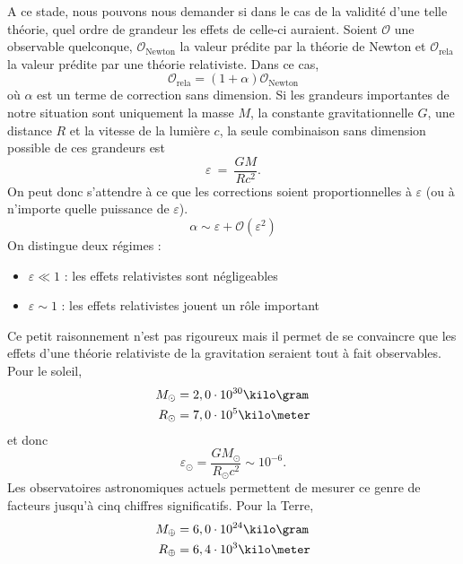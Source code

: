 \documentclass[a4paper,11pt]{report}
\theoremstyle{definition}
\theoremstyle{plain}
\theoremstyle{definition}
\theoremstyle{remark}
\renewcommand{\O}{\mathcal{O}}
\begin{document}
        A ce stade, nous pouvons nous demander si dans le cas de la validité d'une telle théorie, quel ordre de grandeur les effets de celle-ci auraient. Soient $\O$ une observable quelconque, $\O_{\text{Newton}}$ la valeur prédite par la théorie de Newton et $\O_{\text{rela}}$ la valeur prédite par une théorie relativiste. Dans ce cas,
        \begin{equation}
            \O_{\text{rela}} = (1+\alpha)\O_{\text{Newton}}
        \end{equation}
        où $\alpha$ est un terme de correction sans dimension. Si les grandeurs importantes de notre situation sont uniquement la masse $M$, la constante gravitationnelle $G$, une distance $R$ et la vitesse de la lumière $c$, la seule combinaison sans dimension possible de ces grandeurs est 
        \begin{equation}
            \varepsilon~\hat{=}~\frac{GM}{Rc^2}.
        \end{equation}
        On peut donc s'attendre à ce que les corrections soient proportionnelles à $\varepsilon$ (ou à n'importe quelle puissance de $\varepsilon$).
        \begin{equation}
            \alpha\sim\varepsilon+\O(\varepsilon^2)
        \end{equation}
        On distingue deux régimes :
        \begin{itemize}[label=\textbullet]
            \item $\varepsilon\ll 1$ : les effets relativistes sont négligeables
            \item $\varepsilon\sim 1$ : les effets relativistes jouent un rôle important
        \end{itemize}
        Ce petit raisonnement n'est pas rigoureux mais il permet de se convaincre que les effets d'une théorie relativiste de la gravitation seraient tout à fait observables. Pour le soleil,
        \begin{align*}
            M_\odot &= 2,0\cdot10^{30}\kilo\gram \\
            R_\odot &= 7,0\cdot10^{5}\kilo\meter
        \end{align*}
        et donc
        \begin{equation}
            \varepsilon_\odot  = \frac{GM_\odot}{R_\odot c^2}\sim 10^{-6}.
        \end{equation}
        Les observatoires astronomiques actuels permettent de mesurer ce genre de facteurs jusqu'à cinq chiffres significatifs. Pour la Terre,
        \begin{align*}
            M_\oplus &= 6,0\cdot10^{24}\kilo\gram \\
            R_\oplus &= 6,4\cdot10^{3}\kilo\meter
        \end{align*}
\end{document}

